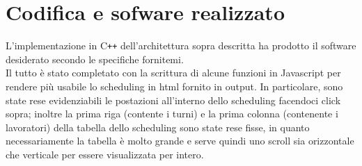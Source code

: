 \section{Codifica e sofware realizzato}
L'implementazione in C\texttt{++} dell'architettura sopra descritta ha prodotto il software desiderato secondo le specifiche fornitemi.\\
Il tutto è stato completato con la scrittura di alcune funzioni in Javascript per rendere più usabile lo scheduling in html fornito in output. In particolare, sono state rese evidenziabili le postazioni all'interno dello scheduling facendoci click sopra; inoltre la prima riga (contente i turni) e la prima colonna (contenente i lavoratori) della tabella dello scheduling sono state rese fisse, in quanto necessariamente la tabella è molto grande e serve quindi uno scroll sia orizzontale che verticale per essere visualizzata per intero.